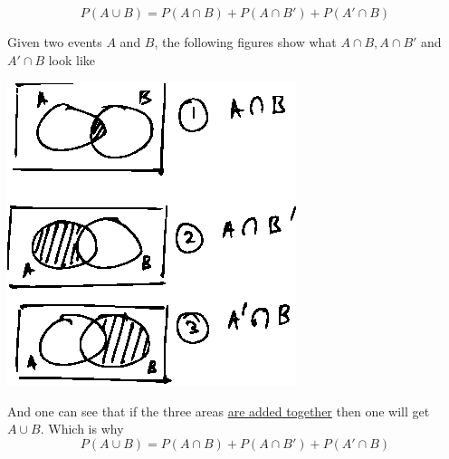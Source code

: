 \documentclass[14pt,fleqn]{extarticle}
\newcommand\prob[1]{ P \left(#1 \right)}
\begin{document}
 
\begin{snippet}
    \correct
    
    \[\prob{A\cup B} = \prob{A\cap B} + \prob{A\cap B'} + \prob{A'\cap B} \]
    
    \reason
    
    Given two events $A$ and $B$, the following figures show 
    what $A\cap B, A\cap B'$ and $A'\cap B$ look like 
    
    \begin{center}
\includegraphics[scale=1.4]{98-A.eps}
\end{center}

And one can see that if the three areas \underline{are added together} then one will 
get $A\cup B$. Which is why 
\[\prob{A\cup B} = \prob{A\cap B} + \prob{A\cap B'} + \prob{A'\cap B} \]
\end{snippet} 
\end{document}
